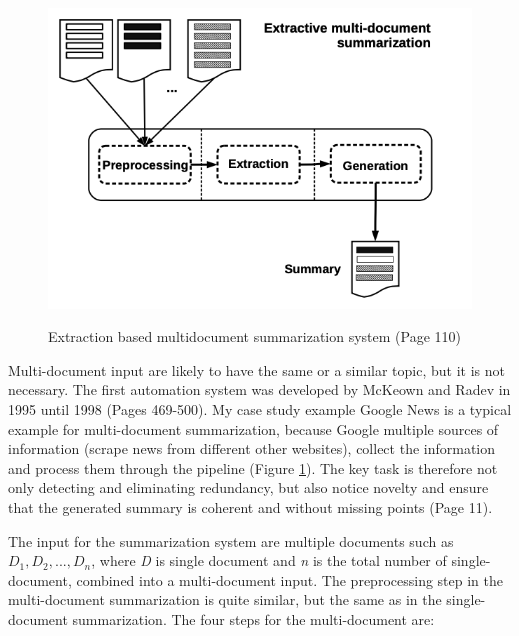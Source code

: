 \begin{figure}
	\begin{center}
		\includegraphics[width=4.5in]{photos/multidoc}\\
		\caption{Extraction based multidocument summarization system \cite{juan} (Page 110)}\label{multi}
	\end{center}
\end{figure}

Multi-document input are likely to have the same or a similar topic, but it is not necessary. The first automation system was developed by McKeown and Radev in 1995 until 1998 \cite{radev-mckeown-1998-generating} (Pages 469-500). My case study example Google News is a typical example for multi-document summarization, because Google multiple sources of information (scrape news from different other websites), collect the information and process them through the pipeline (Figure \ref{multi}). The key task is therefore not only detecting and eliminating redundancy, but also notice novelty and ensure that the generated summary is coherent and without missing points \cite{Das07asurvey} (Page 11).
 
The input for the summarization system are multiple documents such as \(D_{1}, D_{2},..., D_{n}\), where \textit{D} is single document and \textit{n} is the total number of single-document, combined into a multi-document input.
The preprocessing step in the multi-document summarization is quite similar, but the same as in the single-document summarization. The four steps for the multi-document are:
 
